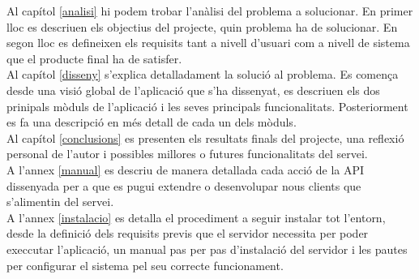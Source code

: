 Al capítol \ref{analisi} hi podem trobar l'anàlisi del problema a solucionar. En primer lloc es descriuen els objectius del projecte, quin problema ha de solucionar. En segon lloc es defineixen els requisits tant a nivell d'usuari com a nivell de sistema que el producte final ha de satisfer.\\

Al capítol \ref{disseny} s'explica detalladament la solució al problema. Es comença desde una visió global de l'aplicació que s'ha dissenyat, es descriuen els dos prinipals mòduls de l'aplicació i les seves principals funcionalitats. Posteriorment es fa una descripció en més detall de cada un dels mòduls.\\

Al capítol \ref{conclusions} es presenten els resultats finals del projecte, una reflexió personal de l'autor i possibles millores o futures funcionalitats del servei. \\

A l'annex \ref{manual} es descriu de manera detallada cada acció de la API dissenyada per a que es pugui extendre o desenvolupar nous clients que s'alimentin del servei. \\

A l'annex \ref{instalacio} es detalla el procediment a seguir instalar tot l'entorn, desde la definició dels requisits previs que el servidor necessita per poder execcutar l'aplicació, un manual pas per pas d'instalació del servidor i les pautes per configurar el sistema pel seu correcte funcionament.\\
